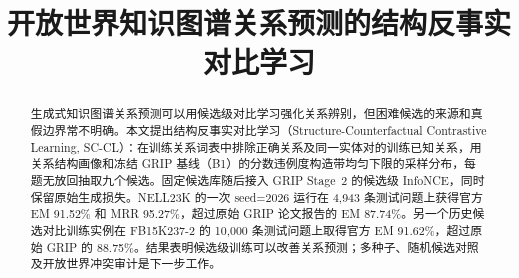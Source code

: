 \documentclass{article}
\title{开放世界知识图谱关系预测的结构反事实对比学习}
\author{}
\newcommand{\scc}{\textsc{SC-CL}}
\newcommand{\bone}{\textsc{B1}}
\begin{document}
\maketitle
\begin{center}
\small{}
\end{center}

\begin{abstract}
生成式知识图谱关系预测可以用候选级对比学习强化关系辨别，但困难候选的来源和真假边界常不明确。本文提出结构反事实对比学习（Structure-Counterfactual Contrastive Learning, \scc）：在训练关系词表中排除正确关系及同一实体对的训练已知关系，用关系结构画像和冻结 GRIP 基线（\bone）的分数违例度构造带均匀下限的采样分布，每题无放回抽取九个候选。固定候选库随后接入 GRIP Stage~2 的候选级 InfoNCE，同时保留原始生成损失。NELL23K 的一次 seed=2026 运行在 4,943 条测试问题上获得官方 EM 91.52\% 和 MRR 95.27\%，超过原始 GRIP 论文报告的 EM 87.74\%。另一个历史候选对比训练实例在 FB15K237-2 的 10,000 条测试问题上取得官方 EM 91.62\%，超过原始 GRIP 的 88.75\%。结果表明候选级训练可以改善关系预测；多种子、随机候选对照及开放世界冲突审计是下一步工作。
\end{abstract}









\clearpage
\appendix




\end{document}
